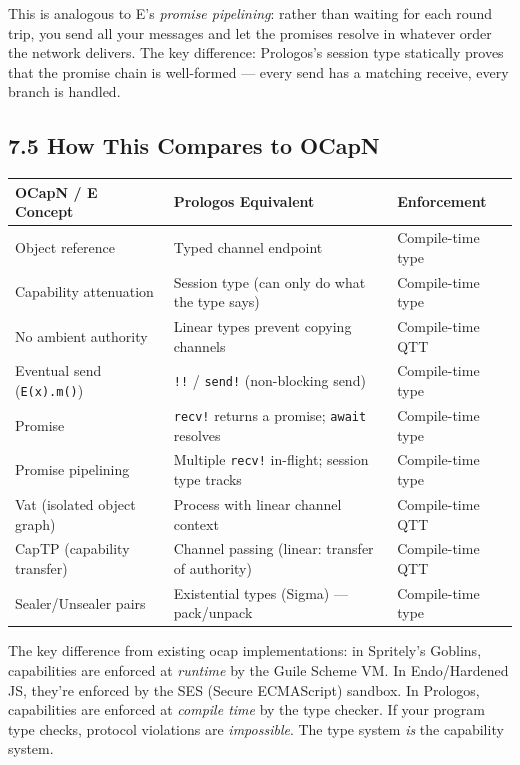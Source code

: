 \documentclass[11pt]{article}
\begin{document}
This is analogous to E's \emph{promise pipelining}: rather than waiting for
each round trip, you send all your messages and let the promises resolve
in whatever order the network delivers. The key difference: Prologos's
session type statically proves that the promise chain is well-formed ---
every send has a matching receive, every branch is handled.
\subsection{7.5 How This Compares to OCapN}
\label{sec:org3f771ae}

\begin{center}
\begin{tabular}{lll}
OCapN / E Concept & Prologos Equivalent & Enforcement\\
\hline
Object reference & Typed channel endpoint & Compile-time type\\
Capability attenuation & Session type (can only do what the type says) & Compile-time type\\
No ambient authority & Linear types prevent copying channels & Compile-time QTT\\
Eventual send (\texttt{E(x).m()}) & \texttt{!!} / \texttt{send!} (non-blocking send) & Compile-time type\\
Promise & \texttt{recv!} returns a promise; \texttt{await} resolves & Compile-time type\\
Promise pipelining & Multiple \texttt{recv!} in-flight; session type tracks & Compile-time type\\
Vat (isolated object graph) & Process with linear channel context & Compile-time QTT\\
CapTP (capability transfer) & Channel passing (linear: transfer of authority) & Compile-time QTT\\
Sealer/Unsealer pairs & Existential types (Sigma) — pack/unpack & Compile-time type\\
\end{tabular}
\end{center}

The key difference from existing ocap implementations: in Spritely's
Goblins, capabilities are enforced at \emph{runtime} by the Guile Scheme VM.
In Endo/Hardened JS, they're enforced by the SES (Secure ECMAScript)
sandbox. In Prologos, capabilities are enforced at \emph{compile time} by the
type checker. If your program type checks, protocol violations are
\emph{impossible}. The type system \emph{is} the capability system.
\end{document}
